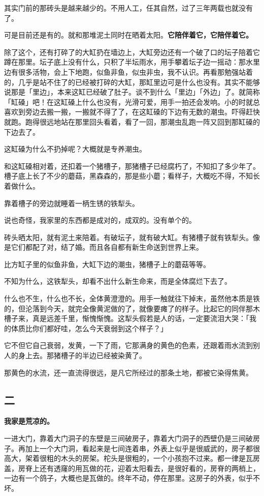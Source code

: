 \documentclass[UTF8]{ctexart}
\begin{document}
其实门前的那砖头是越来越少的。不用人工，任其自然，过了三年两载也就没有了。

可是目前还是有的。就和那堆泥土同时在晒着太阳。\textbf{它陪伴着它，它陪伴着它。}

除了这个，还有打碎了的大缸扔在墙边上，大缸旁边还有一个破了口的坛子陪着它蹲在那里。坛子底上没有什么，只积了半坛雨水，用手攀着坛子边一摇动：那水里边有很多活物，会上下地跑，似鱼非鱼，似虫非虫，我不认识。再看那勉强站着的，几乎是站不住了的已经被打碎的大缸，那缸里边可是什么也没有。其实不能够说那是「里边」，本来这缸已经破了肚子。谈不到什么「里边」「外边」了。就简称「缸磉」吧！在这缸磉上什么也没有，光滑可爱，用手一拍还会发响。小的时就总喜欢到旁边去搬一搬，一搬就不得了了，在这缸磉的下边有无数的潮虫。吓得赶快就跑。跑得很远地站在那里回头看着，看了一回，那潮虫乱跑一阵又回到那缸磉的下边去了。

这缸磉为什么不扔掉呢？大概就是专养潮虫。

和这缸磉相对着，还扣着一个猪槽子，那猪槽子已经腐朽了，不知扣了多少年了。槽子底上长了不少的蘑菇，黑森森的，那是些小蘑；看样子，大概吃不得，不知长着做什么。

靠着槽子的旁边就睡着一柄生锈的铁犁头。

说也奇怪，我家里的东西都是成对的，成双的。没有单个的。

砖头晒太阳，就有泥土来陪着。有破坛子，就有破大缸。有猪槽子就有铁犁头。像是它们都配了对，结了婚。而且各自都有新生命送到世界上来。

比方缸子里的似鱼非鱼，大缸下边的潮虫，猪槽子上的蘑菇等等。

不知为什么，这铁犁头，却看不出什么新生命来，而是全体腐烂下去了。

什么也不生，什么也不长，全体黄澄澄的。用手一触就往下掉末，虽然他本质是铁的，但沦落到今天，就完全像黄泥做的了，就像要瘫了的样子。比起它的同伴那木槽子来，真是远差千里，惭愧惭愧。这犁头假若是人的话，一定要流泪大哭：「我的体质比你们都好哇，怎么今天衰弱到这个样子？」

它不但它自己衰弱，发黄，一下了雨，它那满身的黄色的色素，还跟着雨水流到别人的身上去。那猪槽子的半边已经被染黄了。

那黄色的水流，还一直流得很远，是凡它所经过的那条土地，都被它染得焦黄。

\subsection{二}

\textbf{我家是荒凉的。}

一进大门，靠着大门洞子的东壁是三间破房子，靠着大门洞子的西壁仍是三间破房子。再加上一个大门洞，看起来是七间连着串，外表上似乎是很威武的，房子都很高大，架着很粗的木头的房架。柁头是很粗的，一个小孩抱不过来。都一律是瓦房盖，房脊上还有透窿的用瓦做的花，迎着太阳看去，是很好看的，房脊的两梢上，一边有一个鸽子，大概也是瓦做的。终年不动，停在那里。这房子的外表，似乎不坏。
\end{document}

